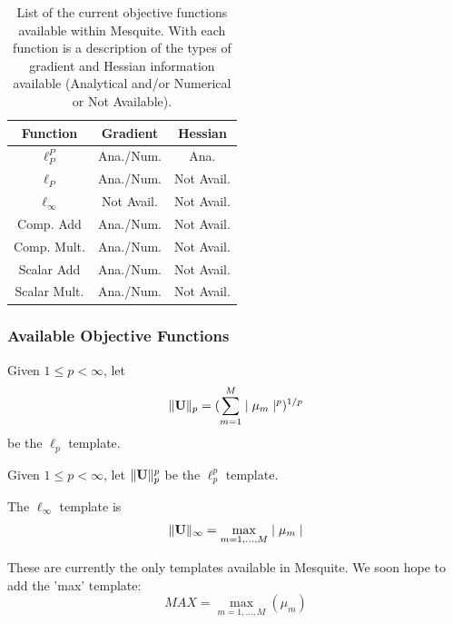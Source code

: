 \documentclass[letter]{report}
\begin{document}
\begin{table}[htb]
\begin{center}
\begin{tabular}{|c|c|c|}
\hline
Function & Gradient & Hessian\\
\hline
$\ell_P^P$     & Ana./Num.&Ana.\\
$\ell_P$       & Ana./Num.& Not Avail.\\
$\ell_{\infty}$& Not Avail.& Not Avail.\\
Comp. Add      & Ana./Num.& Not Avail.\\
Comp. Mult.    & Ana./Num.& Not Avail.\\
Scalar Add     & Ana./Num.& Not Avail.\\
Scalar Mult.   & Ana./Num.& Not Avail.\\
\hline
\end{tabular}
\label{current-objfunc}
\caption{List of the current objective functions available within
Mesquite.  With each function is a description of the types of
gradient and Hessian information available (Analytical and/or Numerical
or Not Available).}
\end{center}
\end{table}

\subsubsection{Available Objective Functions}

 \newline
Given $1 \leq p < \infty$, let
\begin{equation}
\| {\bf U} \|_p = ( \sum_{m=1}^M \mid \mu_m \mid^p )^{1/p}
\end{equation}
be the $\ell_p$ template. \newline

 \newline
Given $1 \leq p < \infty$, let $\| {\bf U} \|_p^p$ be the 
$\ell_p^p$ template. \newline

 \newline
The $\ell_{\infty}$ template is
\begin{equation}
\| {\bf U} \|_{\infty} = \max_{m=1,\ldots,M} \mid \mu_m \mid
\end{equation}

These are currently the only templates available in Mesquite.
We soon hope to add the 'max' template:
\begin{equation}
MAX = \max_{m=1,\ldots,M} ( \mu_m )
\end{equation}
\end{document}
